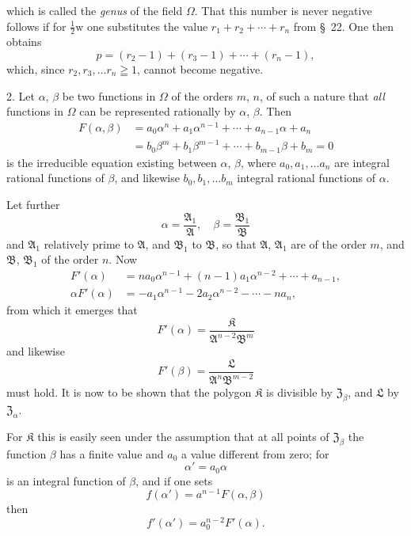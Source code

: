 \documentclass{article}
\begin{document}
which is called the \emph{genus} of the field $\Omega$. That this number is never negative follows if for $\frac{1}{2}\mathrm{w}$ one substitutes the value $r_{1}+r_{2}+\cdots+r_{n}$ from §~22. One then obtains
\[ p = (r_{2}-1)+(r_{3}-1)+\cdots+(r_{n}-1), \tag{2.} \]
which, since $r_{2}, r_{3}, \ldots r_{n} \geqq 1$, cannot become negative.

2. Let $\alpha$, $\beta$ be two functions in $\Omega$ of the orders $m$, $n$, of such a nature that \emph{all} functions in $\Omega$ can be represented rationally by $\alpha$, $\beta$. Then
\[ \begin{aligned} F(\alpha, \beta) &= a_{0}\alpha^{n} + a_{1}\alpha^{n-1} + \cdots + a_{n-1}\alpha + a_{n} \\ &= b_{0}\beta^{m} + b_{1}\beta^{m-1} + \cdots + b_{m-1}\beta + b_{m} = 0 \end{aligned} \]
is the irreducible equation existing between $\alpha$, $\beta$, where $a_{0}, a_{1}, \ldots a_{n}$ are integral rational functions of $\beta$, and likewise $b_{0}, b_{1}, \ldots b_{m}$ integral rational functions of $\alpha$.

Let further
\[ \alpha = \frac{\mathfrak{A}_{1}}{\mathfrak{A}}, \quad \beta = \frac{\mathfrak{B}_{1}}{\mathfrak{B}} \]
and $\mathfrak{A}_{1}$ relatively prime to $\mathfrak{A}$, and $\mathfrak{B}_{1}$ to $\mathfrak{B}$, so that $\mathfrak{A}$, $\mathfrak{A}_{1}$ are of the order $m$, and $\mathfrak{B}$, $\mathfrak{B}_{1}$ of the order $n$. Now
\[ \begin{aligned} F'(\alpha) &= na_{0}\alpha^{n-1} + (n-1)a_{1}\alpha^{n-2} + \cdots + a_{n-1}, \\ \alpha F'(\alpha) &= -a_{1}\alpha^{n-1} - 2a_{2}\alpha^{n-2} - \cdots - na_{n}, \end{aligned} \]
from which it emerges that
\[ F'(\alpha) = \frac{\mathfrak{K}}{\mathfrak{A}^{n-2}\mathfrak{B}^{m}} \]
and likewise
\[ F'(\beta) = \frac{\mathfrak{L}}{\mathfrak{A}^{n}\mathfrak{B}^{m-2}} \]
must hold. It is now to be shown that the polygon $\mathfrak{K}$ is divisible by $\mathfrak{Z}_{\beta}$, and $\mathfrak{L}$ by $\mathfrak{Z}_{\alpha}$.

For $\mathfrak{K}$ this is easily seen under the assumption that at all points of $\mathfrak{Z}_{\beta}$ the function $\beta$ has a finite value and $a_{0}$ a value different from zero; for
\[ \alpha' = a_{0}\alpha \]
is an integral function of $\beta$, and if one sets
\[ f(\alpha') = a^{n-1}F(\alpha, \beta) \]
then
\[ f'(\alpha') = a_{0}^{n-2}F'(\alpha). \]
\end{document}
